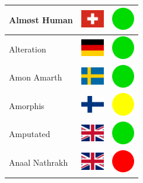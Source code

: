 \documentclass[12pt, a4paper, twoside]{report}
\begin{document}
\begin{center}
\begin{longtable}{|p{5cm}|p{2cm}|p{2cm}|}
 Almøst Human                                               & \includegraphics[width=1cm]{../4x3/ch} &   \includegraphics[width=1cm]{../likes/y} \\ \hline
 Alteration                                                 & \includegraphics[width=1cm]{../4x3/de} &   \includegraphics[width=1cm]{../likes/y} \\ \hline
 Amon Amarth                                                & \includegraphics[width=1cm]{../4x3/se} &   \includegraphics[width=1cm]{../likes/y} \\ \hline
 Amorphis                                                   & \includegraphics[width=1cm]{../4x3/fi} &   \includegraphics[width=1cm]{../likes/m} \\ \hline
 Amputated                                                  & \includegraphics[width=1cm]{../4x3/gb} &   \includegraphics[width=1cm]{../likes/y} \\ \hline
 Anaal Nathrakh                                             & \includegraphics[width=1cm]{../4x3/gb} &   \includegraphics[width=1cm]{../likes/n} \\ \hline

\end{longtable}
\end{center}
\end{document}
